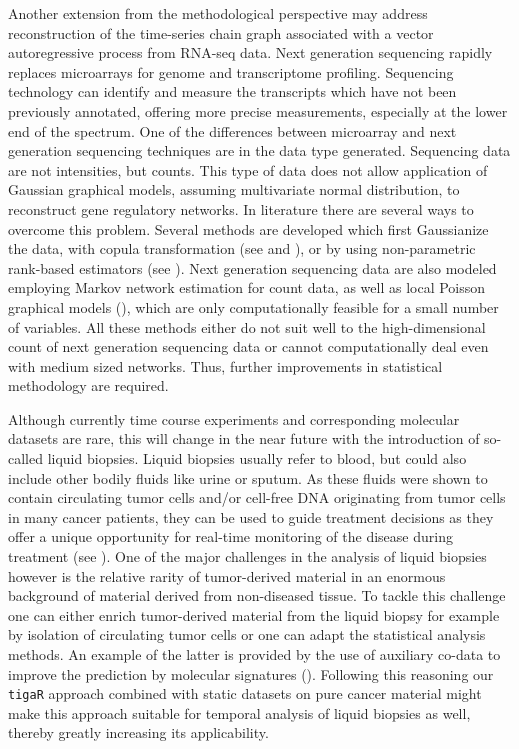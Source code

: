 \begin{conclusion}
Another extension from the methodological perspective may address reconstruction of the time-series chain graph associated with a vector autoregressive process from RNA-seq data. Next generation sequencing rapidly replaces microarrays for genome and transcriptome profiling. Sequencing technology can identify and measure the transcripts which have not been previously annotated, offering more precise measurements, especially at the lower end of the spectrum. One of the differences between microarray and next generation sequencing techniques are in the data type generated. Sequencing data are not intensities, but counts. This type of data does not allow application of Gaussian graphical models, assuming multivariate normal distribution, to reconstruct gene regulatory networks. In literature there are several ways to overcome this problem. Several methods are developed which first Gaussianize the data, with copula transformation (see \cite{Liu2009} and \cite{Dobra2011}), or by using non-parametric rank-based estimators (see \cite{Liu2012}). Next generation sequencing data are also modeled employing Markov network estimation for count data, as well as local Poisson graphical models (\cite{Allen2013}), which are only computationally feasible for a small number of variables. All these methods either do not suit well to the high-dimensional count of next generation sequencing data or cannot computationally deal even with medium sized networks. Thus, further improvements in statistical methodology are required.

Although currently time course experiments and corresponding molecular datasets are rare, this will change in the near future with the introduction of so-called liquid biopsies. Liquid biopsies usually refer to blood, but could also include other bodily fluids like urine or sputum. As these fluids were shown to contain circulating tumor cells and/or cell-free DNA originating from tumor cells in many cancer patients, they can be used to guide treatment decisions as they offer a unique opportunity for real-time monitoring of the disease during treatment (see \cite{Alix2013}). 
One of the major challenges in the analysis of liquid biopsies however is the relative rarity of tumor-derived material in an enormous background of material derived from non-diseased tissue. To tackle this challenge one can either enrich tumor-derived material from the liquid biopsy for example by isolation of circulating tumor cells or one can adapt the statistical analysis methods. An example of the latter is provided by the use of auxiliary co-data to improve the prediction by molecular signatures (\cite{Novianti2017}). Following this reasoning our {\tt tigaR} approach combined with static datasets on pure cancer material might make this approach suitable for temporal analysis of liquid biopsies as well, thereby greatly increasing its applicability.


\end{conclusion}
